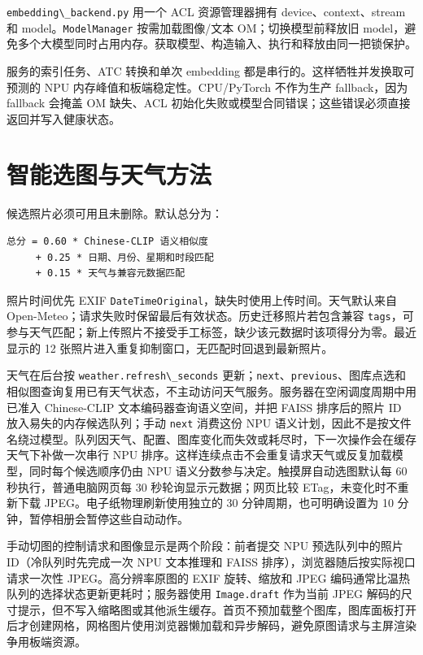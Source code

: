 \passthrough{\lstinline!embedding\_backend.py!} 用一个 ACL
资源管理器拥有 device、context、stream 和
model。\passthrough{\lstinline!ModelManager!} 按需加载图像/文本
OM；切换模型前释放旧
model，避免多个大模型同时占用内存。获取模型、构造输入、执行和释放由同一把锁保护。

服务的索引任务、ATC 转换和单次 embedding
都是串行的。这样牺牲并发换取可预测的 NPU
内存峰值和板端稳定性。CPU/PyTorch 不作为生产 fallback，因为 fallback
会掩盖 OM 缺失、ACL
初始化失败或模型合同错误；这些错误必须直接返回并写入健康状态。

\section{智能选图与天气方法}\label{ux667aux80fdux9009ux56feux4e0eux5929ux6c14ux65b9ux6cd5}

候选照片必须可用且未删除。默认总分为：

\begin{lstlisting}
总分 = 0.60 * Chinese-CLIP 语义相似度
     + 0.25 * 日期、月份、星期和时段匹配
     + 0.15 * 天气与兼容元数据匹配
\end{lstlisting}

照片时间优先 EXIF
\passthrough{\lstinline!DateTimeOriginal!}，缺失时使用上传时间。天气默认来自
Open-Meteo；请求失败时保留最后有效状态。历史迁移照片若包含兼容
\passthrough{\lstinline!tags!}，可参与天气匹配；新上传照片不接受手工标签，缺少该元数据时该项得分为零。最近显示的
12 张照片进入重复抑制窗口，无匹配时回退到最新照片。

天气在后台按 \passthrough{\lstinline!weather.refresh\_seconds!}
更新；\passthrough{\lstinline!next!}、\passthrough{\lstinline!previous!}、图库点选和相似图查询复用已有天气状态，不主动访问天气服务。服务器在空闲调度周期中用已准入
Chinese-CLIP 文本编码器查询语义空间，并把 FAISS 排序后的照片 ID
放入易失的内存候选队列；手动 \passthrough{\lstinline!next!} 消费这份 NPU
语义计划，因此不是按文件名绕过模型。队列因天气、配置、图库变化而失效或耗尽时，下一次操作会在缓存天气下补做一次串行
NPU
排序。这样连续点击不会重复请求天气或反复加载模型，同时每个候选顺序仍由
NPU 语义分数参与决定。触摸屏自动选图默认每 60 秒执行，普通电脑网页每 30
秒轮询显示元数据；网页比较 ETag，未变化时不重新下载
JPEG。电子纸物理刷新使用独立的 30 分钟周期，也可明确设置为 10
分钟，暂停相册会暂停这些自动动作。

手动切图的控制请求和图像显示是两个阶段：前者提交 NPU 预选队列中的照片
ID（冷队列时先完成一次 NPU 文本推理和 FAISS
排序），浏览器随后按实际视口请求一次性 JPEG。高分辨率原图的 EXIF
旋转、缩放和 JPEG 编码通常比温热队列的选择状态更新更耗时；服务器使用
\passthrough{\lstinline!Image.draft!} 作为当前 JPEG
解码的尺寸提示，但不写入缩略图或其他派生缓存。首页不预加载整个图库，图库面板打开后才创建网格，网格图片使用浏览器懒加载和异步解码，避免原图请求与主屏渲染争用板端资源。

